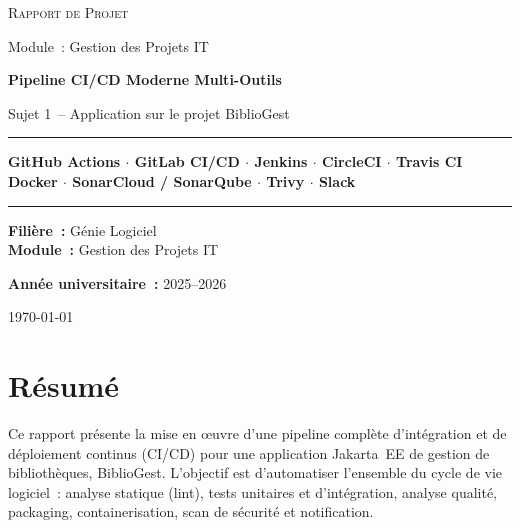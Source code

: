 \documentclass[12pt,a4paper]{report}
\begin{document}
\begin{titlepage}
\centering
\vspace*{1cm}
{\scshape\Large Rapport de Projet\par}
\vspace{0.3cm}
{\large Module~: Gestion des Projets IT\par}
\vspace{1.5cm}
{\Huge\bfseries Pipeline CI/CD Moderne Multi-Outils\par}
\vspace{0.5cm}
{\large Sujet 1~-- Application sur le projet BiblioGest\par}
\vspace{1.8cm}
\rule{\textwidth}{0.5pt}
\vspace{0.4cm}
{\large\bfseries GitHub Actions $\cdot$ GitLab CI/CD $\cdot$ Jenkins $\cdot$ CircleCI $\cdot$ Travis CI \\
Docker $\cdot$ SonarCloud / SonarQube $\cdot$ Trivy $\cdot$ Slack\par}
\vspace{0.4cm}
\rule{\textwidth}{0.5pt}
\vspace{2cm}

\begin{minipage}{0.45\textwidth}
\raggedright
\textbf{Filière~:} Génie Logiciel\\
\textbf{Module~:} Gestion des Projets IT
\end{minipage}
\hfill
\begin{minipage}{0.45\textwidth}
\raggedleft
\textbf{Année universitaire~:} 2025--2026
\end{minipage}

\vfill
{\large\today\par}
\end{titlepage}

\chapter*{Résumé}

Ce rapport présente la mise en \oe{}uvre d'une pipeline complète d'intégration
et de déploiement continus (CI/CD) pour une application Jakarta~EE de gestion
de bibliothèques, BiblioGest. L'objectif est d'automatiser l'ensemble du cycle
de vie logiciel~: analyse statique (lint), tests unitaires et d'intégration,
analyse qualité, packaging, containerisation, scan de sécurité et notification.
\end{document}

